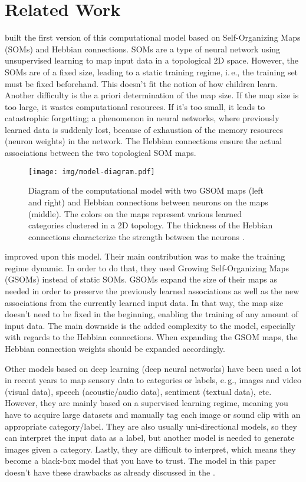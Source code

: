 \documentclass[twocolumn]{article}
\begin{document}
\section{Related Work} \label{sec:related-work}
\textcite{mayor_neurocomputational_2010} built the first version of this computational model based on Self-Organizing Maps (SOMs) and Hebbian connections. SOMs are a type of neural network using unsupervised learning to map input data in a topological 2D space. However, the SOMs are of a fixed size, leading to a static training regime, i.\,e., the training set must be fixed beforehand. This doesn't fit the notion of how children learn. Another difficulty is the a priori determination of the map size. If the map size is too large, it wastes computational resources. If it's too small, it leads to catastrophic forgetting; a phenomenon in neural networks, where previously learned data is suddenly lost, because of exhaustion of the memory resources (neuron weights) in the network. The Hebbian connections ensure the actual associations between the two topological SOM maps.

\begin{figure}[h]
\centering
\texttt{[image: img/model-diagram.pdf]}
\caption{Diagram of the computational model with two GSOM maps (left and right) and Hebbian connections between neurons on the maps (middle). The colors on the maps represent various learned categories clustered in a 2D topology. The thickness of the Hebbian connections characterize the strength between the neurons \parencite{walling_visual_2018}.}
\end{figure}

\textcite{gliozzi_visual_2018} improved upon this model. Their main contribution was to make the training regime dynamic. In order to do that, they used Growing Self-Organizing Maps (GSOMs) instead of static SOMs. GSOMs expand the size of their maps as needed in order to preserve the previously learned associations as well as the new associations from the currently learned input data. In that way, the map size doesn't need to be fixed in the beginning, enabling the training of any amount of input data. The main downside is the added complexity to the model, especially with regards to the Hebbian connections. When expanding the GSOM maps, the Hebbian connection weights should be expanded accordingly.

Other models based on deep learning (deep neural networks) have been used a lot in recent years to map sensory data to categories or labels, e.\,g., images and video (visual data), speech (acoustic/audio data), sentiment (textual data), etc. However, they are mainly based on a supervised learning regime, meaning you have to acquire large datasets and manually tag each image or sound clip with an appropriate category/label. They are also usually uni-directional models, so they can interpret the input data as a label, but another model is needed to generate images given a category. Lastly, they are difficult to interpret, which means they become a black-box model that you have to trust. The model in this paper doesn't have these drawbacks as already discussed in the .
\end{document}
